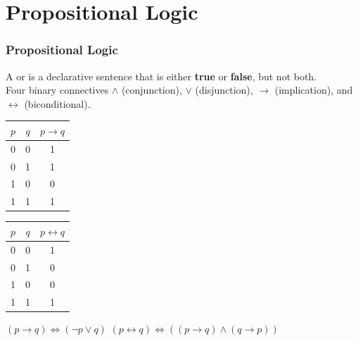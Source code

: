 \documentclass{beamer}
\begin{document}
\section{Propositional Logic}
\begin{frame}
    \frametitle{Propositional Logic}
    \hh A  or  is a declarative sentence that is either 
    \textbf{true} or \textbf{false}, but not both.
    \\ 
    \hh Four binary connectives  $\wedge$ (conjunction), $\vee$ (disjunction), $\to$ (implication), and $\leftrightarrow$ (biconditional).
    \\ \vv
    \begin{minipage}{\textwidth}
        \begin{minipage}[t]{0.45\textwidth}
            \centering
            \begin{tabular}{ccc}
                \hline
                $p$ & $q$ & $p \to q$ \\ \hline
                 0  &  0  &     1     \\
                 0  &  1  &     1     \\
                 \rowcolor{mygray} 1  &  0  &     0     \\
                 1  &  1  &     1     \\ \hline
            \end{tabular}
        \end{minipage}
        \begin{minipage}[t]{0.45\textwidth}
            \centering
            \begin{tabular}{ccc}
                \hline
                $p$ & $q$ & $p \leftrightarrow q$ \\ \hline
                 0  &  0  &           1           \\
                 0  &  1  &           0           \\
                 1  &  0  &           0           \\
                 1  &  1  &           1           \\ \hline
            \end{tabular}
        \end{minipage}
    \end{minipage}	
    \vv
    \par \phantom{jijiijij}$(p \to q) \Leftrightarrow (\neg p \vee q)$ \phantom{jijijijijijiji}$(p \leftrightarrow q) \Leftrightarrow ((p \to q) \wedge (q \to p))$ 
\end{frame}
\end{document}
